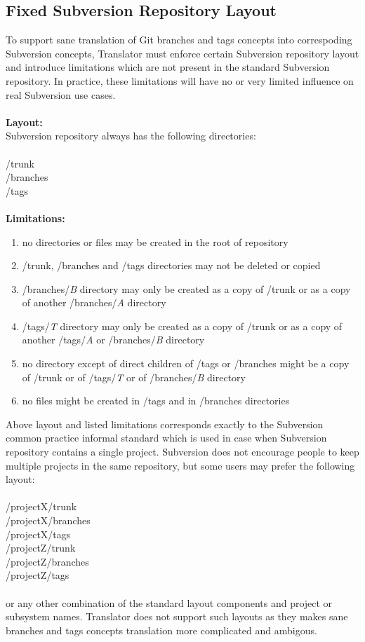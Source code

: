 \subsection{Fixed Subversion Repository Layout}

To support sane translation of Git branches and tags concepts into correspoding Subversion concepts, Translator must enforce certain Subversion repository layout and introduce limitations which are not present in the standard Subversion repository. 
In practice, these limitations will have no or very limited influence on real Subversion use cases.
\\\\
\textbf{Layout:}\\ 
Subversion repository always has the following directories:
\\\\
/trunk\\
/branches\\
/tags\\\\
\textbf{Limitations:}
\begin{enumerate}
\item no directories or files may be created in the root of repository
\item /trunk, /branches and /tags directories may not be deleted or copied
\item /branches/\emph{B} directory may only be created as a copy of /trunk or
as a copy of another /branches/\emph{A} directory
\item /tags/\emph{T} directory may only be created as a copy of /trunk or
as a copy of another /tags/\emph{A} or /branches/\emph{B} directory
\item no directory except of direct children of /tags or /branches might be a
copy of /trunk or of /tags/\emph{T} or of /branches/\emph{B} directory
\item no files might be created in /tags and in /branches directories
\end{enumerate}
Above layout and listed limitations corresponds exactly to the Subversion common practice informal standard which
is used in case when Subversion repository contains a single project. Subversion does not encourage people 
to keep multiple projects in the same repository, but some users may prefer the following layout:
\\\\
/projectX/trunk\\
/projectX/branches\\
/projectX/tags\\
/projectZ/trunk\\
/projectZ/branches\\
/projectZ/tags\\\\
or any other combination of the standard layout components and project or subsystem names. Translator does not support such layouts as they 
makes sane branches and tags concepts translation more complicated and ambigous.
